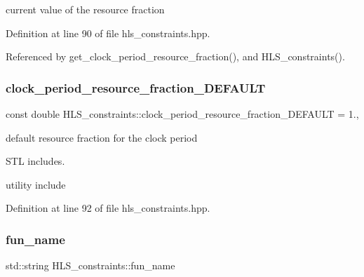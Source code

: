 current value of the resource fraction 



Definition at line 90 of file hls\+\_\+constraints.\+hpp.



Referenced by get\+\_\+clock\+\_\+period\+\_\+resource\+\_\+fraction(), and H\+L\+S\+\_\+constraints().

\mbox{\label{classHLS__constraints_aa51dd0b45775afa572cd49fb686b14b6}} 
\subsubsection{\texorpdfstring{clock\+\_\+period\+\_\+resource\+\_\+fraction\+\_\+\+D\+E\+F\+A\+U\+LT}{clock\_period\_resource\_fraction\_DEFAULT}}
{\footnotesize\ttfamily const double H\+L\+S\+\_\+constraints\+::clock\+\_\+period\+\_\+resource\+\_\+fraction\+\_\+\+D\+E\+F\+A\+U\+LT = 1.\hspace{0.3cm}{\ttfamily [static]}, {\ttfamily [private]}}



default resource fraction for the clock period 

S\+TL includes.

utility include 

Definition at line 92 of file hls\+\_\+constraints.\+hpp.

\mbox{\label{classHLS__constraints_ab112ab399141c42790fc367163eb5534}} 
\subsubsection{\texorpdfstring{fun\+\_\+name}{fun\_name}}
{\footnotesize\ttfamily std\+::string H\+L\+S\+\_\+constraints\+::fun\+\_\+name\hspace{0.3cm}{\ttfamily [private]}}



